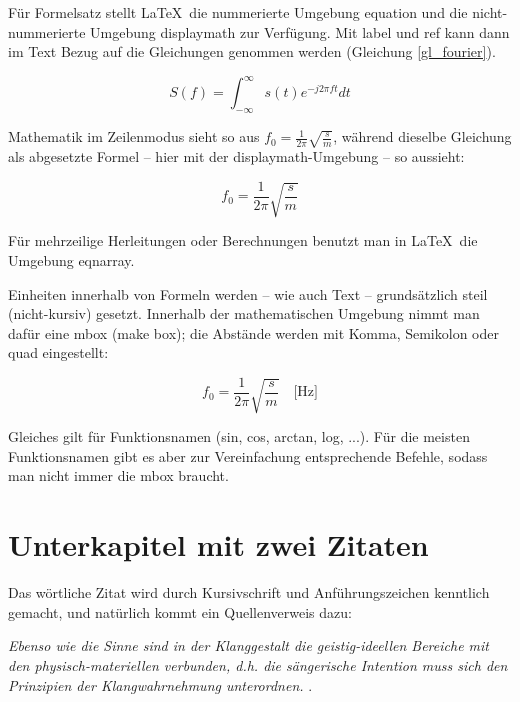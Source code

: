 Für Formelsatz stellt \LaTeX\ die nummerierte Umgebung equation und die nicht-nummerierte Umgebung displaymath zur Verfügung. Mit label und ref kann dann im Text Bezug auf die Gleichungen genommen werden (Gleichung \ref{gl_fourier}).

\begin{equation}\label{gl_fourier}
S(f) = \int_{-\infty}^{\infty} s(t)e^{-j 2 \pi f t}dt
\end{equation}

Mathematik im Zeilenmodus sieht so aus $f_0 = \frac{1}{2\pi} \sqrt{\frac{s}{m}}$, während dieselbe Gleichung als abgesetzte Formel -- hier mit der displaymath-Umgebung -- so aussieht:

\begin{displaymath}
f_0 = \frac{1}{2\pi} \sqrt{\frac{s}{m}}
\end{displaymath}

Für mehrzeilige Herleitungen oder Berechnungen benutzt man in \LaTeX\ die Umgebung eqnarray.

Einheiten innerhalb von Formeln werden -- wie auch Text -- grundsätzlich steil (nicht-kursiv) gesetzt. Innerhalb der mathematischen Umgebung nimmt man dafür eine mbox (make box); die Abstände werden mit Komma, Semikolon oder quad eingestellt:

\begin{displaymath}
f_0 = \frac{1}{2\pi} \sqrt{\frac{s}{m}} \quad \mbox{[Hz]}
\end{displaymath}

Gleiches gilt für Funktionsnamen (sin, cos, arctan, log, ...). Für die meisten Funktionsnamen gibt es aber zur Vereinfachung entsprechende Befehle, sodass man nicht immer die mbox braucht.


\section{Unterkapitel mit zwei Zitaten}

Das wörtliche Zitat wird durch Kursivschrift und Anführungszeichen kenntlich gemacht, und natürlich kommt ein Quellenverweis dazu:

\medskip
\emph{\glqq Ebenso wie die Sinne sind in der Klanggestalt die geistig-ideellen Bereiche mit den physisch-materiellen verbunden, d.h. die sängerische Intention muss sich den Prinzipien der Klangwahrnehmung unterordnen.\grqq} \citep[111]{sowodniok}.
\medskip

